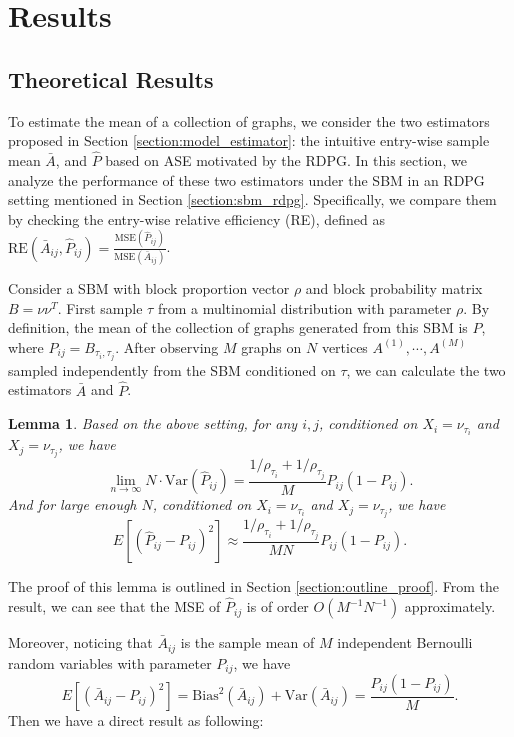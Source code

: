 \documentclass[a4paper]{article}
\newtheorem{lemma}[fact]{Lemma}
\begin{document}
\section{Results}

\subsection{Theoretical Results}
\label{section:theoretical_result}
To estimate the mean of a collection of graphs, we consider the two estimators proposed in Section \ref{section:model_estimator}: the intuitive entry-wise sample mean $\bar{A}$, and $\hat{P}$ based on ASE motivated by the RDPG.
In this section, we analyze the performance of these two estimators under the SBM in an RDPG setting mentioned in Section \ref{section:sbm_rdpg}. Specifically, we compare them by checking the entry-wise relative efficiency (RE), defined as $\mathrm{RE}(\bar{A}_{ij}, \hat{P}_{ij}) = \frac{\mathrm{MSE}(\hat{P}_{ij})}{\mathrm{MSE}(\bar{A}_{ij})}$.

Consider a SBM with block proportion vector $\rho$ and block probability matrix $B = \nu \nu^T$. First sample $\tau$ from a multinomial distribution with parameter $\rho$. By definition, the mean of the collection of graphs generated from this SBM is $P$, where $P_{ij} = B_{\tau_i, \tau_j}$. After observing $M$ graphs on $N$ vertices $A^{(1)}, \cdots, A^{(M)}$ sampled independently from the SBM conditioned on $\tau$, we can calculate the two estimators $\bar{A}$ and $\hat{P}$.

\begin{lemma}
\label{lm:VarPhat}
Based on the above setting, for any $i, j$, conditioned on $X_i = \nu_{\tau_i}$ and $X_j = \nu_{\tau_j}$, we have
\[
	\lim_{n \to \infty} N \cdot \mathrm{Var}(\hat{P}_{ij}) =
    \frac{1/\rho_{\tau_i} + 1/\rho_{\tau_j}}{M} P_{ij} (1 - P_{ij}).
\]
And for large enough $N$, conditioned on $X_i = \nu_{\tau_i}$ and $X_j = \nu_{\tau_j}$, we have
\[
	E[(\hat{P}_{ij} - P_{ij})^2] \approx
    \frac{1/\rho_{\tau_i} + 1/\rho_{\tau_j}}{M N} P_{ij}(1-P_{ij}).
\]
\end{lemma}

The proof of this lemma is outlined in Section \ref{section:outline_proof}. From the result, we can see that the MSE of $\hat{P}_{ij}$ is of order $O(M^{-1}N^{-1})$ approximately.

Moreover, noticing that $\bar{A}_{ij}$ is the sample mean of $M$ independent Bernoulli random variables with parameter $P_{ij}$, we have
\[
	E[(\bar{A}_{ij} - P_{ij})^2] = \mathrm{Bias}^2(\bar{A}_{ij}) + \mathrm{Var}(\bar{A}_{ij}) = \frac{P_{ij}(1-P_{ij})}{M}.
\]
Then we have a direct result as following:
\end{document}
